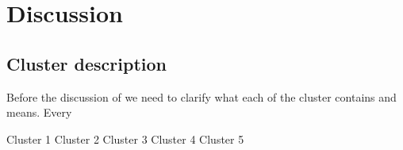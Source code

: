 \section{Discussion}

\subsection{Cluster description}
Before the discussion of we need to clarify what each of the cluster contains and means. Every 

Cluster 1
Cluster 2
Cluster 3
Cluster 4
Cluster 5

